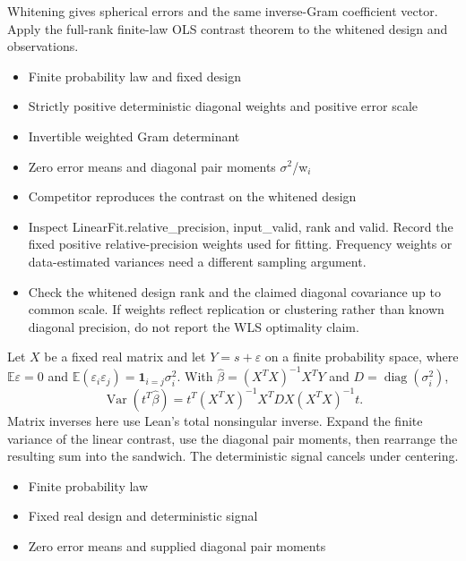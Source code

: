 \expandafter\def\csname statadic@proof@STATADIC-LINEAR-006\endcsname{Whitening gives spherical errors and the same inverse-Gram
  coefficient vector. Apply the full-rank finite-law OLS contrast theorem to
  the whitened design and observations.}
\expandafter\def\csname statadic@assumptions@STATADIC-LINEAR-006\endcsname{\begin{itemize}
\item Finite probability law and fixed design
\item Strictly positive deterministic diagonal weights and positive error scale
\item Invertible weighted Gram determinant
\item Zero error means and diagonal pair moments \ensuremath{\sigma}\ensuremath{{}^2}/w\ensuremath{{}_i}
\item Competitor reproduces the contrast on the whitened design
\end{itemize}}
\expandafter\def\csname statadic@diagnostics@STATADIC-LINEAR-006\endcsname{\begin{itemize}
\item Inspect LinearFit.relative\_precision, input\_valid, rank and valid. Record the fixed positive relative-precision weights used for fitting. Frequency weights or data-estimated variances need a different sampling argument.
\item Check the whitened design rank and the claimed diagonal covariance up to common scale. If weights reflect replication or clustering rather than known diagonal precision, do not report the WLS optimality claim.
\end{itemize}}
\expandafter\def\csname statadic@statement@STATADIC-LINEAR-007\endcsname{Let $X$ be a fixed real matrix and let $Y=s+\varepsilon$
  on a finite probability space, where $\mathbb E\varepsilon=0$ and
  $\mathbb E(\varepsilon_i\varepsilon_j)=\mathbf 1_{i=j}\sigma_i^2$.
  With $\hat\beta=(X^TX)^{-1}X^TY$ and $D=\operatorname{diag}(\sigma_i^2)$,
  \[\operatorname{Var}(t^T\hat\beta)=
  t^T(X^TX)^{-1}X^TDX(X^TX)^{-1}t.\]
  Matrix inverses here use Lean's total nonsingular inverse.}
\expandafter\def\csname statadic@proof@STATADIC-LINEAR-007\endcsname{Expand the finite variance of the linear contrast, use the
  diagonal pair moments, then rearrange the resulting sum into the sandwich.
  The deterministic signal cancels under centering.}
\expandafter\def\csname statadic@assumptions@STATADIC-LINEAR-007\endcsname{\begin{itemize}
\item Finite probability law
\item Fixed real design and deterministic signal
\item Zero error means and supplied diagonal pair moments
\end{itemize}}
